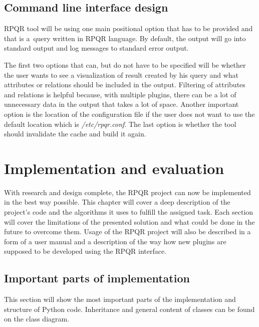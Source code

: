 \newpage

\section{Command line interface design}
RPQR tool will be using one main positional option that has to be provided and that is a~query written
in RPQR language. By default, the output will go into standard output and log messages to standard error output.

The first two options that can, but do not have to be specified will be whether the user wants to see a visualization
of result created by his query and what attributes or relations should be included in the output.
Filtering of attributes and relations is helpful because, with multiple plugins, there can be a lot
of unnecessary data in the output that takes a lot of space. Another important option is the location
of the configuration file if the user does not want to use the default location which is \textit{/etc/rpqr.conf}.
The last option is whether the tool should invalidate the cache and build it again.

\chapter{Implementation and evaluation}
With research and design complete, the RPQR project can now be implemented in the best way possible.
This chapter will cover a deep description of the project's code and the algorithms it uses to fulfill the
assigned task. Each section will cover the limitations of the presented solution and what could be done
in the future to overcome them. Usage of the RPQR project will also be described in a form of a user
manual and a description of the way how new plugins are supposed to be developed using the RPQR interface.

\section{Important parts of implementation}
This section will show the most important parts of the implementation and structure of Python code.
Inheritance and general content of classes can be found on the class diagram.

\newpage

